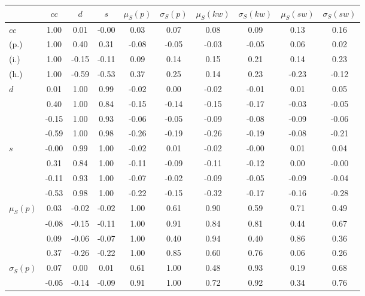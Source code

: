 \begin{table*}[h!]
\begin{center}
\begin{tabular}{| l | c | c | c | c | c | c | c | c | c |}\hline
 & $cc$ & $d$ & $s$ & $\mu_S(p)$ & $\sigma_S(p)$ & $\mu_S(kw)$ & $\sigma_S(kw)$ & $\mu_S(sw)$ & $\sigma_S(sw)$ \\\hline
$cc$ & 1.00  & 0.01  & -0.00  & 0.03  & 0.07  & 0.08  & 0.09  & 0.13  & 0.16 \\\hline
(p.) & 1.00  & 0.40  & 0.31  & -0.08  & -0.05  & -0.03  & -0.05  & 0.06  & 0.02 \\\hline
(i.) & 1.00  & -0.15  & -0.11  & 0.09  & 0.14  & 0.15  & 0.21  & 0.14  & 0.23 \\\hline
(h.) & 1.00  & -0.59  & -0.53  & 0.37  & 0.25  & 0.14  & 0.23  & -0.23  & -0.12 \\\hline
$d$ & 0.01  & 1.00  & 0.99  & -0.02  & 0.00  & -0.02  & -0.01  & 0.01  & 0.05 \\\hline
 & 0.40  & 1.00  & 0.84  & -0.15  & -0.14  & -0.15  & -0.17  & -0.03  & -0.05 \\\hline
 & -0.15  & 1.00  & 0.93  & -0.06  & -0.05  & -0.09  & -0.08  & -0.09  & -0.06 \\\hline
 & -0.59  & 1.00  & 0.98  & -0.26  & -0.19  & -0.26  & -0.19  & -0.08  & -0.21 \\\hline
$s$ & -0.00  & 0.99  & 1.00  & -0.02  & 0.01  & -0.02  & -0.00  & 0.01  & 0.04 \\\hline
 & 0.31  & 0.84  & 1.00  & -0.11  & -0.09  & -0.11  & -0.12  & 0.00  & -0.00 \\\hline
 & -0.11  & 0.93  & 1.00  & -0.07  & -0.02  & -0.09  & -0.05  & -0.09  & -0.04 \\\hline
 & -0.53  & 0.98  & 1.00  & -0.22  & -0.15  & -0.32  & -0.17  & -0.16  & -0.28 \\\hline
$\mu_S(p)$ & 0.03  & -0.02  & -0.02  & 1.00  & 0.61  & 0.90  & 0.59  & 0.71  & 0.49 \\\hline
 & -0.08  & -0.15  & -0.11  & 1.00  & 0.91  & 0.84  & 0.81  & 0.44  & 0.67 \\\hline
 & 0.09  & -0.06  & -0.07  & 1.00  & 0.40  & 0.94  & 0.40  & 0.86  & 0.36 \\\hline
 & 0.37  & -0.26  & -0.22  & 1.00  & 0.85  & 0.60  & 0.76  & 0.06  & 0.26 \\\hline
$\sigma_S(p)$ & 0.07  & 0.00  & 0.01  & 0.61  & 1.00  & 0.48  & 0.93  & 0.19  & 0.68 \\\hline
 & -0.05  & -0.14  & -0.09  & 0.91  & 1.00  & 0.72  & 0.92  & 0.34  & 0.76 \\\hline

\end{tabular}
\end{center}
\end{table*}
